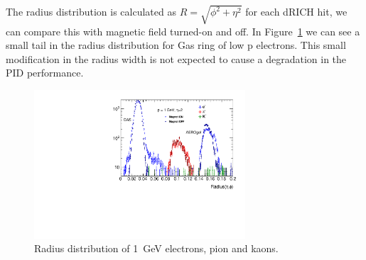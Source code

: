 The radius distribution is calculated as $R=\sqrt{\phi^{2}+\eta^{2}}$ for each dRICH hit, we can compare this with magnetic field turned-on and off. In Figure~\ref{fig:drich_radius_p1_ePiK} we can see a small tail in the radius distribution for Gas ring of low p electrons. This small modification in the radius width is not expected to cause a degradation in the PID performance.
\begin{figure}[h!tbp]
    \centering
    \includegraphics[width=0.7\textwidth]{figs/Radius_p1_shift.pdf}
    \caption{Radius distribution of 1~GeV electrons, pion and kaons.}
    \label{fig:drich_radius_p1_ePiK}
\end{figure}